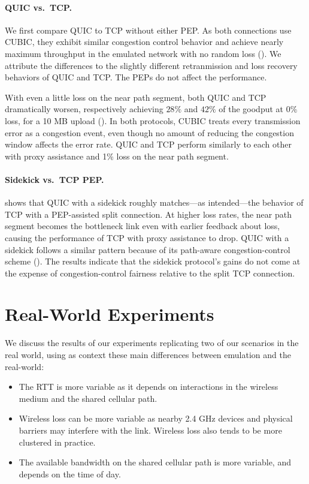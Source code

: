 \paragraph{QUIC vs.\ TCP\@.}
We first compare QUIC to TCP without either PEP\@.
As both connections use CUBIC, they exhibit similar
congestion control behavior and achieve nearly maximum throughput in the
emulated network with no random loss ().
We attribute the differences to the slightly different retranmission and
loss recovery behaviors of QUIC and TCP\@. The PEPs do not affect the
performance.

With even a little loss on the near path segment, both QUIC and TCP dramatically
worsen, respectively achieving $28\%$ and $42\%$ of the goodput at $0\%$ loss,
for a 10 MB upload ().
In both protocols, CUBIC treats every transmission error as a congestion event,
even though no amount of reducing the congestion window affects the error rate.
QUIC and TCP perform similarly to each other with proxy assistance and 1\%
loss on the near path segment.

\paragraph{Sidekick vs.\ TCP PEP\@.}
 shows that QUIC with a sidekick roughly matches---as
 intended---the behavior of TCP with a PEP-assisted split connection. At higher
 loss rates, the near path segment becomes the bottleneck link even with
 earlier feedback about loss, causing the performance of TCP with proxy
 assistance to drop. QUIC with a sidekick follows a similar pattern because of
 its path-aware congestion-control scheme (). The
 results indicate that the sidekick protocol's gains do not come at the expense
 of congestion-control fairness relative to the split TCP connection.

\section{Real-World Experiments}



We discuss the results of our experiments replicating two of our scenarios in
the real world, using as context
these main differences between emulation and the real-world:

\begin{itemize}[noitemsep,topsep=0pt]
	\item The RTT is more variable as it depends on interactions in the
	wireless medium and the shared cellular path.
	\item Wireless loss can be more variable as nearby 2.4 GHz devices and
	physical barriers may interfere with the link. Wireless loss also tends
	to be more clustered in practice.
	\item The available bandwidth on the shared cellular path is more variable,
	and depends on the time of day.
\end{itemize}

